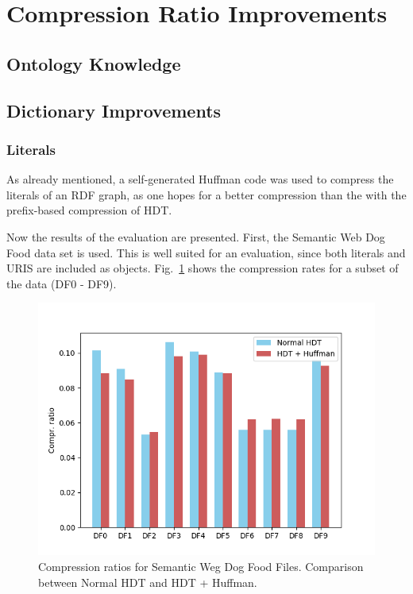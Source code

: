 \section{Compression Ratio Improvements}

\subsection{Ontology Knowledge}\label{sec:evaluationOntKnowledge}

\subsection{Dictionary Improvements}\label{sec:evaluationDictImprovements}


\subsubsection{Literals}

As already mentioned, a self-generated Huffman code was used to compress the literals of an RDF graph, as one hopes for a better compression than the with the prefix-based compression of HDT.

Now the results of the evaluation are presented. First, the Semantic Web Dog Food data set is used. This is well suited for an evaluation, since both literals and URIS are included as objects. Fig.~\ref{fig:dogfoodcomprratios} shows the compression rates for a subset of the data (DF0 - DF9). 



\begin{figure}
	\centering
	\includegraphics[width=0.7\linewidth]{figures/4_evaluation/dogFoodComprRatios}
	\caption{Compression ratios for Semantic Weg Dog Food Files. Comparison between Normal HDT and HDT + Huffman.}
	\label{fig:dogfoodcomprratios}
\end{figure}

